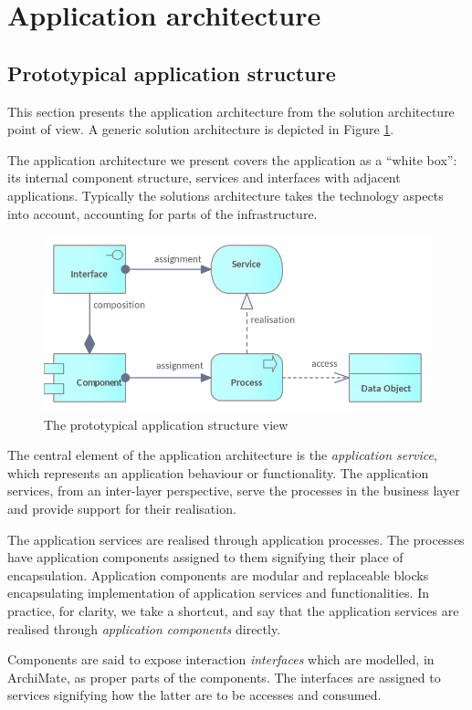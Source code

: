 \section{Application architecture}
\label{sec:application-architecture}

	\subsection{Prototypical application structure}
	
	This section presents the application architecture from the solution architecture point of view. A generic solution architecture is depicted in Figure \ref{fig:application-view}.
	
	The application architecture we present covers the application as a ``white box'': its internal component structure, services and interfaces with adjacent applications. Typically the solutions architecture takes the technology aspects into account, accounting for parts of the infrastructure.
	
    \begin{figure}[h]
		\centering
		\includegraphics[width=.5\textwidth]{images/views/Application view.png}
		\caption{The prototypical application structure view}
		\label{fig:application-view}
	\end{figure}

	The central element of the application architecture is the \textit{application service}, which represents an application behaviour or functionality. The application services, from an inter-layer perspective, serve the processes in the business layer and provide support for their realisation. 
	
	The application services are realised through application processes. The processes have application components assigned to them signifying their place of encapsulation. Application components are modular and replaceable blocks encapsulating 
	implementation of application services and functionalities. In practice, for clarity, we take a shortcut, and say that the application services are realised through \textit{application components} directly.
	
	Components are said to expose interaction \textit{interfaces} which are modelled, in ArchiMate, as proper parts of the components. The interfaces are assigned to services signifying how the latter are to be accesses and consumed. 
	
